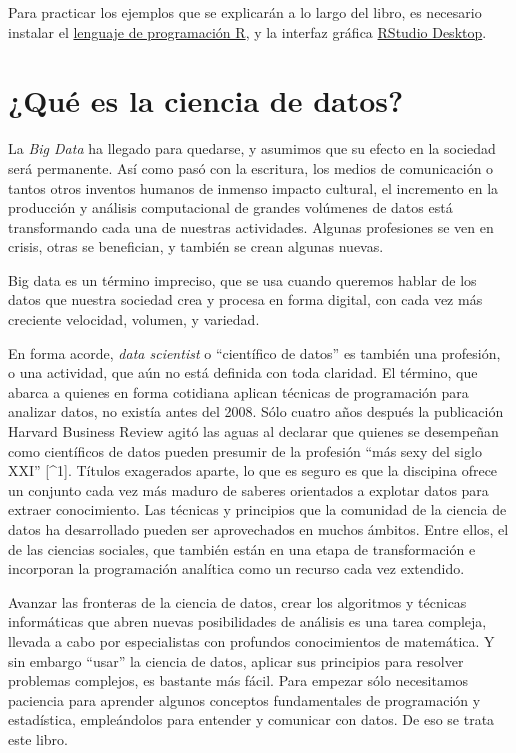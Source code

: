 \documentclass[spanish,]{book}
\begin{document}
Para practicar los ejemplos que se explicarán a lo largo del libro, es necesario instalar el \href{https://cloud.r-project.org/}{lenguaje de programación R}, y la interfaz gráfica \href{https://www.rstudio.com/products/rstudio/download/}{RStudio Desktop}.

\hypertarget{que-es-la-ciencia-de-datos}{%
\chapter{¿Qué es la ciencia de datos?}\label{que-es-la-ciencia-de-datos}}

La \emph{Big Data} ha llegado para quedarse, y asumimos que su efecto en la sociedad será permanente. Así como pasó con la escritura, los medios de comunicación o tantos otros inventos humanos de inmenso impacto cultural, el incremento en la producción y análisis computacional de grandes volúmenes de datos está transformando cada una de nuestras actividades. Algunas profesiones se ven en crisis, otras se benefician, y también se crean algunas nuevas.

Big data es un término impreciso, que se usa cuando queremos hablar de los datos que nuestra sociedad crea y procesa en forma digital, con cada vez más creciente velocidad, volumen, y variedad.

En forma acorde, \emph{data scientist} o ``científico de datos'' es también una profesión, o una actividad, que aún no está definida con toda claridad. El término, que abarca a quienes en forma cotidiana aplican técnicas de programación para analizar datos, no existía antes del 2008. Sólo cuatro años después la publicación Harvard Business Review agitó las aguas al declarar que quienes se desempeñan como científicos de datos pueden presumir de la profesión ``más sexy del siglo XXI'' {[}\^{}1{]}. Títulos exagerados aparte, lo que es seguro es que la discipina ofrece un conjunto cada vez más maduro de saberes orientados a explotar datos para extraer conocimiento. Las técnicas y principios que la comunidad de la ciencia de datos ha desarrollado pueden ser aprovechados en muchos ámbitos. Entre ellos, el de las ciencias sociales, que también están en una etapa de transformación e incorporan la programación analítica como un recurso cada vez extendido.

Avanzar las fronteras de la ciencia de datos, crear los algoritmos y técnicas informáticas que abren nuevas posibilidades de análisis es una tarea compleja, llevada a cabo por especialistas con profundos conocimientos de matemática. Y sin embargo ``usar'' la ciencia de datos, aplicar sus principios para resolver problemas complejos, es bastante más fácil. Para empezar sólo necesitamos paciencia para aprender algunos conceptos fundamentales de programación y estadística, empleándolos para entender y comunicar con datos. De eso se trata este libro.
\end{document}
